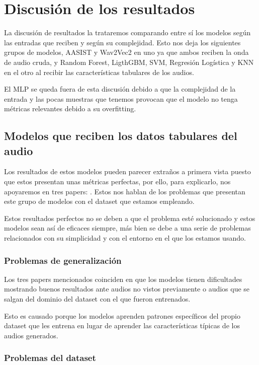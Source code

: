 \section{Discusión de los resultados}
\label{sec:discusion_resultados}

La discusión de resultados la trataremos comparando entre sí los modelos según las entradas que reciben y según su complejidad. Esto nos deja los siguientes grupos de modelos, AASIST y Wav2Vec2 en uno ya que ambos reciben la onda de audio cruda, y Random Forest, LigthGBM, SVM, Regresión Logística y KNN en el otro al recibir las características tabulares de los audios.

El MLP se queda fuera de esta discusión debido a que la complejidad de la entrada y las pocas muestras que tenemos provocan que el modelo no tenga métricas relevantes debido a su overfitting. 

\subsection*{Modelos que reciben los datos tabulares del audio}

Los resultados de estos modelos pueden parecer extraños a primera vista puesto que estos presentan unas métricas perfectas, por ello, para explicarlo, nos apoyaremos en tres papers: \cite{firc2025deepfake,p2v2025,crossdomain2024}. Estos nos hablan de los problemas que presentan este grupo de modelos con el dataset que estamos empleando.

Estos resultados perfectos no se deben a que el problema esté solucionado y estos modelos sean así de eficaces siempre, más bien se debe a una serie de problemas relacionados con su simplicidad y con el entorno en el que los estamos usando.

\subsubsection*{Problemas de generalización}

Los tres papers mencionados coinciden en que los modelos tienen dificultades mostrando buenos resultados ante audios no vistos previamente o audios que se salgan del dominio del dataset con el que fueron entrenados.

Esto es causado porque los modelos aprenden patrones específicos del propio dataset que les entrena en lugar de aprender las características típicas de los audios generados.

\subsubsection*{Problemas del dataset}

